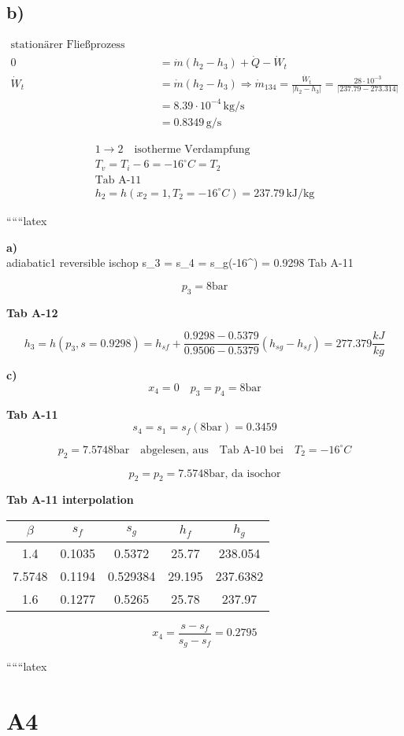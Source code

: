 

\subsection*{b)}

\begin{align*}
    \text{stationärer Fließprozess beim Verdampfer} \\
    0 &= \dot{m} (h_2 - h_3) + \dot{Q} - \dot{W}_t \\
    \dot{W}_t &= \dot{m} (h_2 - h_3) \Rightarrow \dot{m}_{134} = \frac{\dot{W}_t}{|h_2 - h_3|} = \frac{28 \cdot 10^{-3}}{|237.79 - 273.314|} \\
    &= 8.39 \cdot 10^{-4} \, \text{kg/s} \\
    &= 0.8349 \, \text{g/s}
\end{align*}

\begin{align*}
    1 \rightarrow 2 \quad \text{isotherme Verdampfung} \\
    T_v = T_i - 6 = -16^\circ C = T_2 \\
    \text{Tab A-11} \\
    h_2 = h(x_2 = 1, T_2 = -16^\circ C) = 237.79 \, \text{kJ/kg}
\end{align*}

``````latex


\textbf{a)} \\
adiabatic1 reversible   \Rightarrow ischop \quad s_3 = s_4 = s_g(-16^\circ) = 0.9298 \quad Tab A-11

\[
p_3 = 8 \text{bar}
\]

\textbf{Tab A-12}  

\[
h_3 = h(p_3, s=0.9298) = h_{sf} + \frac{0.9298 - 0.5379}{0.9506 - 0.5379} (h_{sg} - h_{sf}) = 277.379 \frac{kJ}{kg}
\]

\textbf{c)} \\
\[
x_4 = 0 \quad p_3 = p_4 = 8 \text{bar}
\]

\textbf{Tab A-11} \\
\[
s_4 = s_1 = s_f(\text{8bar}) = 0.3459
\]

\[
p_2 = 7.5748 \text{bar} \quad \text{abgelesen, aus} \quad \text{Tab A-10 bei} \quad T_2 = -16^\circ C
\]

\[
p_2 = p_2 = 7.5748 \text{bar, da isochor}
\]

\textbf{Tab A-11 interpolation}

\begin{tabular}{|c|c|c|c|c|}
\hline
\(\beta\) & \(s_f\) & \(s_g\) & \(h_f\) & \(h_g\) \\
\hline
1.4 & 0.1035 & 0.5372 & 25.77 & 238.054 \\
7.5748 & 0.1194 & 0.529384 & 29.195 & 237.6382 \\
1.6 & 0.1277 & 0.5265 & 25.78 & 237.97 \\
\hline
\end{tabular}

\[
x_4 = \frac{s - s_f}{s_g - s_f} = 0.2795
\]

``````latex


\section*{A4}